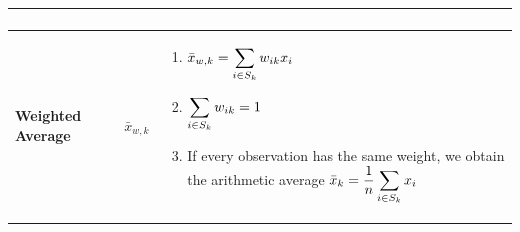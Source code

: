 \begin{customArrayStretch}{1.3}
\begin{longtable}{>{\RaggedRight\arraybackslash}p{4cm} >{\centering\arraybackslash}p{0.5cm} p{10.5cm}}
\begin{minipage}{10.3cm}
\begin{enumerate}[itemsep=0.2cm]
        \end{enumerate}
        \vspace{0.15cm}
    \end{minipage} 
    \\ \hline


\textbf{Weighted Average} &
    $\bar{x}_{w,k}$ &
    \begin{minipage}{10.3cm}
        \vspace{0.15cm}
        \begin{enumerate}[itemsep=0.2cm]
            \item $
                \bar{x}_{w,k}
                = \displaystyle\sum_{i \in S_k} w_{ik}x_i
            $
            \hfill \cite{statistics/book/Statistics-for-Data-Scientists/Maurits-Kaptein}

            \item $
                \displaystyle\sum_{i \in S_k} w_{ik} = 1
            $
            \hfill \cite{statistics/book/Statistics-for-Data-Scientists/Maurits-Kaptein}

            \item If every observation has the same weight, we obtain the arithmetic average $\bar{x}_k = \dfrac{1}{n} \displaystyle\sum_{i \in S_k} x_i$
            \hfill \cite{statistics/book/Statistics-for-Data-Scientists/Maurits-Kaptein}

        \end{enumerate}
        \vspace{0.15cm}
    \end{minipage} 
    \\ \hline


\end{longtable}
\end{customArrayStretch}



